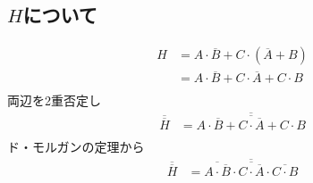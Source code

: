 \subsection{$H$について}
\begin{align*}
  H&=A\cdot\overline{B}+C\cdot(\overline{A}+B)\\
  &=A\cdot\overline{B}+C\cdot\overline{A}+C\cdot{B}\\
\end{align*}
両辺を2重否定し
\begin{align*}
  \overline{\overline{H}}&=\overline{\overline{A\cdot\overline{B}+C\cdot\overline{A}+C\cdot{B}}}\\
\end{align*}
ド・モルガンの定理から
\begin{align*}
  \overline{\overline{H}}&=\overline{\overline{A\cdot\overline{B}}\cdot\overline{C\cdot\overline{A}}\cdot\overline{C\cdot{B}}}
\end{align*}